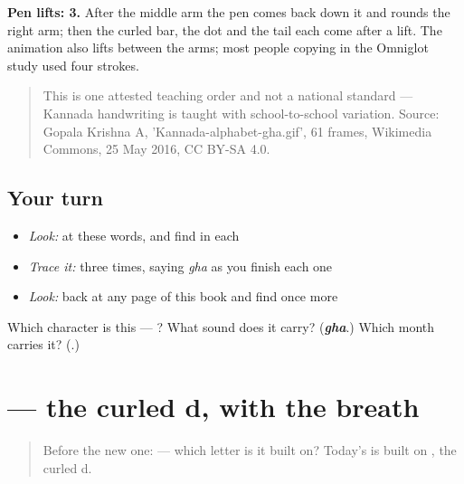 \textbf{Pen lifts: 3.} After the middle arm the pen comes back down it and rounds the right arm; then the curled bar, the dot and the tail each come after a lift. The animation also lifts between the arms; most people copying  in the Omniglot study used four strokes.

\begin{quote}
This is one attested teaching order and not a national standard — Kannada handwriting is taught with school-to-school variation. Source: Gopala Krishna A, 'Kannada-alphabet-gha.gif', 61 frames, Wikimedia Commons, 25 May 2016, CC BY-SA 4.0.
\end{quote}

\subsection*{Your turn}
\begin{itemize}
\raggedright
  \item \emph{Look:} at these words, and find  in each
\end{itemize}

\begin{quote}
\end{quote}

\begin{itemize}
\raggedright
  \item \emph{Trace it:}  three times, saying \emph{gha} as you finish each one
  \item \emph{Look:} back at any page of this book and find  once more
\end{itemize}

\begin{tcolorbox}[breakable,colback=teal!4,colframe=teal!35!black,title={Before you move on}]
Which character is this — ? What sound does it carry? (\emph{\textbf{gha}}.) Which month carries it? (\textbf{}.)
\end{tcolorbox}
\section[\texorpdfstring{\kn{ಢ} (ḍha)}{ಢ (ḍha)}]{ — the curled d, with the breath}

\label{lesson:KA-S172-letter-ddha}



\begin{quote}
Before the new one:  — which letter is it built on? Today's is built on , the curled d.
\end{quote}

